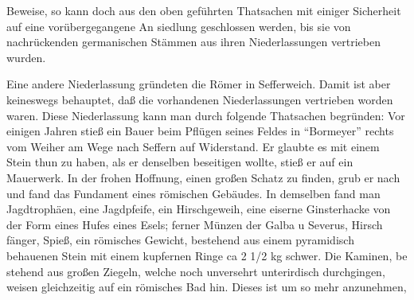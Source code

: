 

Beweise, so kann doch aus den oben geführten Thatsachen\ob
mit einiger Sicherheit auf eine vorübergegangene An\ohb
siedlung geschlossen werden, bis sie von nachrückenden\ob
germanischen Stämmen aus ihren Niederlassungen\ob
vertrieben wurden.

Eine andere Niederlassung gründeten die Römer in\ob
Sefferweich. Damit ist aber keineswegs behauptet, daß die\ob
{}%
vorhandenen Niederlassungen vertrieben worden waren.\ob
Diese Niederlassung kann man durch folgende Thatsachen\ob
begründen: Vor einigen Jahren stieß ein Bauer beim\ob
Pflügen seines Feldes in \enquote{Bormeyer} rechts vom\ob
Weiher am Wege nach Seffern auf Widerstand.\ob
Er glaubte es mit einem Stein thun zu haben, als\ob
er denselben beseitigen wollte, stieß er auf ein\ob
Mauerwerk. In der frohen Hoffnung, einen großen\ob
Schatz zu finden, grub er nach und fand das Fundament\ob
eines         römischen Gebäudes. In demselben fand\ob
man Jagdtrophäen, eine Jagdpfeife, ein Hirschgeweih, eine\ob
eiserne Ginsterhacke von der Form eines Hufes eines\ob
Esels; ferner Münzen der Galba u Severus, Hirsch\ohb
fänger, Spieß, ein römisches Gewicht, bestehend aus\ob
einem pyramidisch behauenen Stein mit einem\ob
kupfernen Ringe ca 2 1/2 kg schwer. Die Kaminen, be\ohb
stehend aus großen Ziegeln, welche noch unversehrt\ob
unterirdisch durchgingen, weisen gleichzeitig auf ein\ob
römisches Bad hin. Dieses ist um so mehr anzunehmen,
\pend
